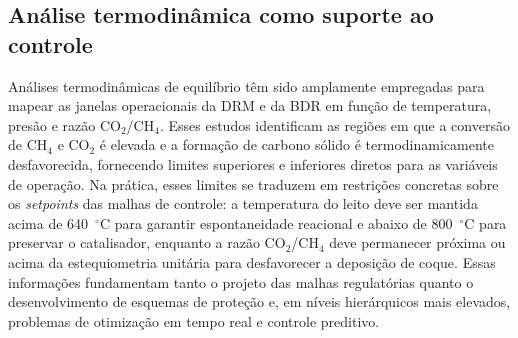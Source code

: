 \subsection{Análise termodinâmica como suporte ao controle}

Análises termodinâmicas de equilíbrio têm sido amplamente empregadas para
mapear as janelas operacionais da DRM e da BDR em função de temperatura,
presão e razão CO\(_2\)/CH\(_4\).\citep{thermodynamics2025,lavoie2014} Esses
estudos identificam as regiões em que a conversão de CH\(_4\) e CO\(_2\) é
elevada e a formação de carbono sólido é termodinamicamente desfavorecida,
fornecendo limites superiores e inferiores diretos para as variáveis de
operação.\citep{thermodynamics2025} Na prática, esses limites se traduzem
em restrições concretas sobre os \emph{setpoints} das malhas de controle: a
temperatura do leito deve ser mantida acima de 640~\(^\circ\)C para garantir
espontaneidade reacional e abaixo de 800~\(^\circ\)C para preservar o
catalisador, enquanto a razão CO\(_2\)/CH\(_4\) deve permanecer próxima ou
acima da estequiometria unitária para desfavorecer a deposição de
coque.\citep{thermodynamics2025,lavoie2014} Essas informações fundamentam
tanto o projeto das malhas regulatórias quanto o desenvolvimento de esquemas
de proteção e, em níveis hierárquicos mais elevados, problemas de
otimização em tempo real e controle preditivo.\citep{thermodynamics2025}

